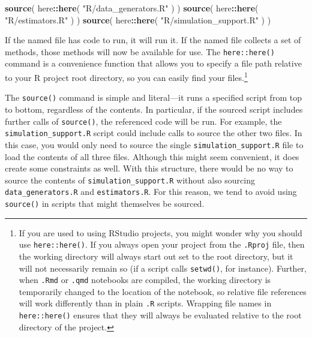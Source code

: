 \documentclass[
]{book}
\newenvironment{Shaded}{\begin{snugshade}}{\end{snugshade}}
\newcommand{\FunctionTok}[1]{\textcolor[rgb]{0.13,0.29,0.53}{\textbf{#1}}}
\newcommand{\NormalTok}[1]{#1}
\newcommand{\SpecialCharTok}[1]{\textcolor[rgb]{0.81,0.36,0.00}{\textbf{#1}}}
\newcommand{\StringTok}[1]{\textcolor[rgb]{0.31,0.60,0.02}{#1}}
\begin{document}
\begin{Shaded}
\begin{Highlighting}[]
\FunctionTok{source}\NormalTok{( here}\SpecialCharTok{::}\FunctionTok{here}\NormalTok{( }\StringTok{"R/data\_generators.R"}\NormalTok{ ) )}
\FunctionTok{source}\NormalTok{( here}\SpecialCharTok{::}\FunctionTok{here}\NormalTok{( }\StringTok{"R/estimators.R"}\NormalTok{ ) )}
\FunctionTok{source}\NormalTok{( here}\SpecialCharTok{::}\FunctionTok{here}\NormalTok{( }\StringTok{"R/simulation\_support.R"}\NormalTok{ ) )}
\end{Highlighting}
\end{Shaded}

If the named file has code to run, it will run it.
If the named file collects a set of methods, those methods will now be available for use.
The \texttt{here::here()} command is a convenience function that allows you to specify a file path relative to your R project root directory, so you can easily find your files.\footnote{If you are used to using RStudio projects, you might wonder why you should use \texttt{here::here()}. If you always open your project from the \texttt{.Rproj} file, then the working directory will always start out set to the root directory, but it will not necessarily remain so (if a script calls \texttt{setwd()}, for instance). Further, when \texttt{.Rmd} or \texttt{.qmd} notebooks are compiled, the working directory is temporarily changed to the location of the notebook, so relative file references will work differently than in plain \texttt{.R} scripts. Wrapping file names in \texttt{here::here()} ensures that they will always be evaluated relative to the root directory of the project.}

The \texttt{source()} command is simple and literal---it runs a specified script from top to bottom, regardless of the contents.
In particular, if the sourced script includes further calls of \texttt{source()}, the referenced code will be run.
For example, the \texttt{simulation\_support.R} script could include calls to source the other two files.
In this case, you would only need to source the single \texttt{simulation\_support.R} file to load the contents of all three files.
Although this might seem convenient, it does create some constraints as well.
With this structure, there would be no way to source the contents of \texttt{simulation\_support.R} without also sourcing \texttt{data\_generators.R} and \texttt{estimators.R}.
For this reason, we tend to avoid using \texttt{source()} in scripts that might themselves be sourced.
\end{document}
